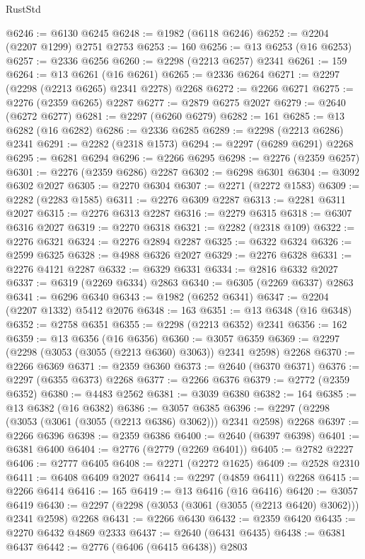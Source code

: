 \begin{lexlean}{RustStd}
\begin{coremodule}
{\begin{coremodule}
{{{{{{{{{{{{{{{{{{{{{{{{{{{{{{{{{{{{{{{{{{{{{{{{{{{{{{@6246 := @6130 @6245
@6248 := @1982 (@6118 @6246)
@6252 := @2204 (@2207 @1299) @2751 @2753
@6253 := 160
@6256 := @13 @6253 (@16 @6253)
@6257 := @2336 @6256
@6260 := @2298 (@2213 @6257) @2341
@6261 := 159
@6264 := @13 @6261 (@16 @6261)
@6265 := @2336 @6264
@6271 := @2297 (@2298 (@2213 @6265) @2341 @2278) @2268
@6272 := @2266 @6271
@6275 := @2276 (@2359 @6265) @2287
@6277 := @2879 @6275 @2027
@6279 := @2640 (@6272 @6277)
@6281 := @2297 (@6260 @6279)
@6282 := 161
@6285 := @13 @6282 (@16 @6282)
@6286 := @2336 @6285
@6289 := @2298 (@2213 @6286) @2341
@6291 := @2282 (@2318 @1573)
@6294 := @2297 (@6289 @6291) @2268
@6295 := @6281 @6294
@6296 := @2266 @6295
@6298 := @2276 (@2359 @6257)
@6301 := @2276 (@2359 @6286) @2287
@6302 := @6298 @6301
@6304 := @3092 @6302 @2027
@6305 := @2270 @6304
@6307 := @2271 (@2272 @1583)
@6309 := @2282 (@2283 @1585)
@6311 := @2276 @6309 @2287
@6313 := @2281 @6311 @2027
@6315 := @2276 @6313 @2287
@6316 := @2279 @6315
@6318 := @6307 @6316 @2027
@6319 := @2270 @6318
@6321 := @2282 (@2318 @109)
@6322 := @2276 @6321
@6324 := @2276 @2894 @2287
@6325 := @6322 @6324
@6326 := @2599 @6325
@6328 := @4988 @6326 @2027
@6329 := @2276 @6328
@6331 := @2276 @4121 @2287
@6332 := @6329 @6331
@6334 := @2816 @6332 @2027
@6337 := @6319 (@2269 @6334) @2863
@6340 := @6305 (@2269 @6337) @2863
@6341 := @6296 @6340
@6343 := @1982 (@6252 @6341)
@6347 := @2204 (@2207 @1332) @5412 @2076
@6348 := 163
@6351 := @13 @6348 (@16 @6348)
@6352 := @2758 @6351
@6355 := @2298 (@2213 @6352) @2341
@6356 := 162
@6359 := @13 @6356 (@16 @6356)
@6360 := @3057 @6359
@6369 := @2297 (@2298 (@3053 (@3055 (@2213 @6360) @3063)) @2341 @2598) @2268
@6370 := @2266 @6369
@6371 := @2359 @6360
@6373 := @2640 (@6370 @6371)
@6376 := @2297 (@6355 @6373) @2268
@6377 := @2266 @6376
@6379 := @2772 (@2359 @6352)
@6380 := @4483 @2562
@6381 := @3039 @6380
@6382 := 164
@6385 := @13 @6382 (@16 @6382)
@6386 := @3057 @6385
@6396 := @2297 (@2298 (@3053 (@3061 (@3055 (@2213 @6386) @3062))) @2341 @2598) @2268
@6397 := @2266 @6396
@6398 := @2359 @6386
@6400 := @2640 (@6397 @6398)
@6401 := @6381 @6400
@6404 := @2776 (@2779 (@2269 @6401))
@6405 := @2782 @2227
@6406 := @2777 @6405
@6408 := @2271 (@2272 @1625)
@6409 := @2528 @2310
@6411 := @6408 @6409 @2027
@6414 := @2297 (@4859 @6411) @2268
@6415 := @2266 @6414
@6416 := 165
@6419 := @13 @6416 (@16 @6416)
@6420 := @3057 @6419
@6430 := @2297 (@2298 (@3053 (@3061 (@3055 (@2213 @6420) @3062))) @2341 @2598) @2268
@6431 := @2266 @6430
@6432 := @2359 @6420
@6435 := @2270 @6432 @4869 @2333
@6437 := @2640 (@6431 @6435)
@6438 := @6381 @6437
@6442 := @2776 (@6406 (@6415 @6438)) @2803
}}}}}}}}}}}}}}}}}}}}}}}}}}}}}}}}}}}}}}}}}}}}}}}}}}}}}}
\end{coremodule}}
\end{coremodule}
\end{lexlean}
